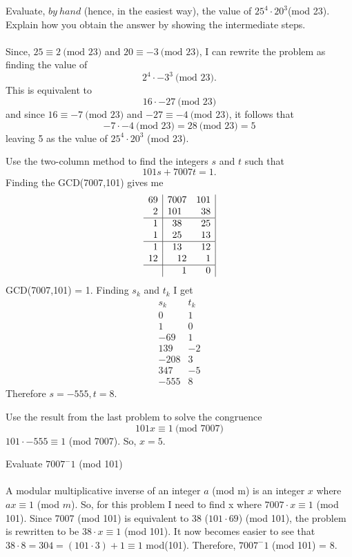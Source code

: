 \documentclass[12pt]{article}
\newenvironment{problem}[2][Problem]{\begin{trivlist}
\item[\hskip \labelsep {\bfseries #1}\hskip \labelsep {\bfseries #2.}]}{\end{trivlist}}
\begin{document}
\begin{problem}{5}
Evaluate, $by \ hand$ (hence, in the easiest way), the value of $25^4 \cdot 20^3$(mod 23). Explain how you obtain the answer by showing the intermediate steps.
\\ \\
Since, $25 \equiv 2 \ \text{(mod 23)}$ and $20 \equiv -3 \ \text{(mod 23)}$, I can rewrite the problem as finding the value of 
$$2^4 \cdot -3^3 \ \text{(mod 23).}$$
This is equivalent to
$$ 16 \cdot -27 \ \text{(mod 23)} $$
and since $16 \equiv -7 \ \text{(mod 23)}$ and $ -27 \equiv -4 \ \text{(mod 23)}$, it follows that 
$$-7 \cdot -4 \ \text{(mod 23)} = 28 \ \text{(mod 23)} = 5 $$
leaving 5 as the value of $25^4 \cdot 20^3$ (mod 23).
\end{problem}
\begin{problem}{6}
Use the two-column method to find the integers $s$ and $t$ such that $$ 101s + 7007t = 1.$$
Finding the GCD(7007,101) gives me
\[ \begin{array}{r|r|r}
69 &7007 \quad 101 \\ 2 &101 \quad \quad 38\\\hline
1 &38 \quad  \quad 25 \\
1 & 25  \quad \quad 13\\\hline
1 & 13  \quad \quad 12 \\
12 & 12 \quad \quad 1 \\\hline
 & 1 \quad \quad 0
 \end{array}
\]
 GCD(7007,101) = 1. Finding $s_k$ and $t_k$ I get
 \[ 
\begin{array}{r|r}
s_k & t_k \\\hline
0 & 1 \\\hline
1 & 0 \\\hline
-69 & 1 \\\hline
139 & -2 \\\hline
-208 & 3 \\\hline
347 & -5 \\\hline
-555 & 8 
\end{array}
\]
Therefore $s = -555, t = 8$.
\end{problem}

\begin{problem}{7}
Use the result from the last problem to solve the congruence $$101x \equiv 1 \ \text{(mod 7007)}$$
$101\cdot-555 \equiv 1$ (mod 7007). So, $x = 5$.
\end{problem}

\begin{problem}{8}
Evaluate $7007^-1$ (mod 101)
\\ \\
A modular multiplicative inverse of an integer $a$ (mod m) is an integer $x$ where  $ax \equiv 1$ (mod $m$). So, for this problem I need to find x where $7007 \cdot x \equiv 1$ (mod 101). Since 7007 (mod 101) is equivalent to 38 ($101 \cdot 69$) (mod 101), the problem is rewritten to be $38 \cdot x \equiv 1$ (mod 101). It now becomes easier to see that $38 \cdot 8 = 304 = (101 \cdot 3)+1 \equiv 1$ mod(101). Therefore, $7007^-1$ (mod 101) = 8.
\end{problem}
\end{document}
